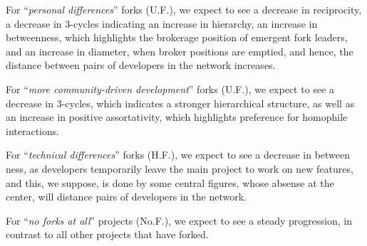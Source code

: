 \documentclass{acm_proc_article-sp}
\begin{document}
For ``\textit{personal differences}'' forks (U.F.), we expect to see a decrease in reciprocity, a decrease in 3-cycles indicating an increase in hierarchy, an increase in betweenness, which highlights the brokerage position of emergent fork leaders, and an increase in diameter, when broker positions are emptied, and hence, the distance between pairs of developers in the network increases. 

For ``\textit{more community-driven development}'' forks (U.F.), we expect to see a decrease in 3-cycles, which indicates a stronger hierarchical structure, as well as an increase in positive assortativity, which highlights preference for homophile interactions.

For  ``\textit{technical differences}'' forks (H.F.), we expect to see a decrease in between ness, as developers temporarily leave the main project to work on new features, and this, we suppose, is done by some central figures, whose absense at the center, will distance pairs of developers in the network.

For ``\textit{no forks at all}'' projects (No.F.), we expect to see a steady progression, in contrast to all other projects that have forked.
\end{document}
